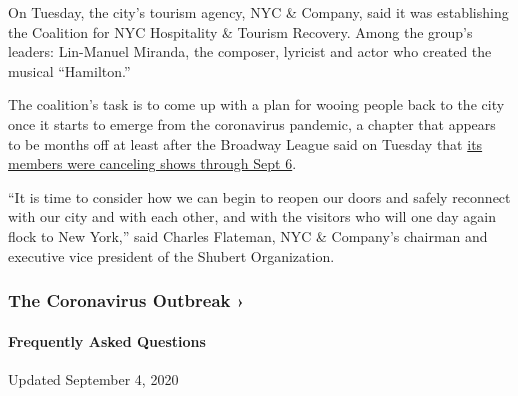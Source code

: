 On Tuesday, the city's tourism agency, NYC \& Company, said it was
establishing the Coalition for NYC Hospitality \& Tourism Recovery.
Among the group's leaders: Lin-Manuel Miranda, the composer, lyricist
and actor who created the musical ``Hamilton.''

The coalition's task is to come up with a plan for wooing people back to
the city once it starts to emerge from the coronavirus pandemic, a
chapter that appears to be months off at least after the Broadway League
said on Tuesday that
\href{https://www.nytimes3xbfgragh.onion/2020/05/12/theater/broadway-coronavirus.html}{its
members were canceling shows through Sept 6}.

``It is time to consider how we can begin to reopen our doors and safely
reconnect with our city and with each other, and with the visitors who
will one day again flock to New York,'' said Charles Flateman, NYC \&
Company's chairman and executive vice president of the Shubert
Organization.

\href{https://www.nytimes3xbfgragh.onion/news-event/coronavirus?action=click\&pgtype=Article\&state=default\&region=MAIN_CONTENT_3\&context=storylines_faq}{}

\hypertarget{the-coronavirus-outbreak-}{%
\subsubsection{The Coronavirus Outbreak
›}\label{the-coronavirus-outbreak-}}

\hypertarget{frequently-asked-questions}{%
\paragraph{Frequently Asked
Questions}\label{frequently-asked-questions}}

Updated September 4, 2020

